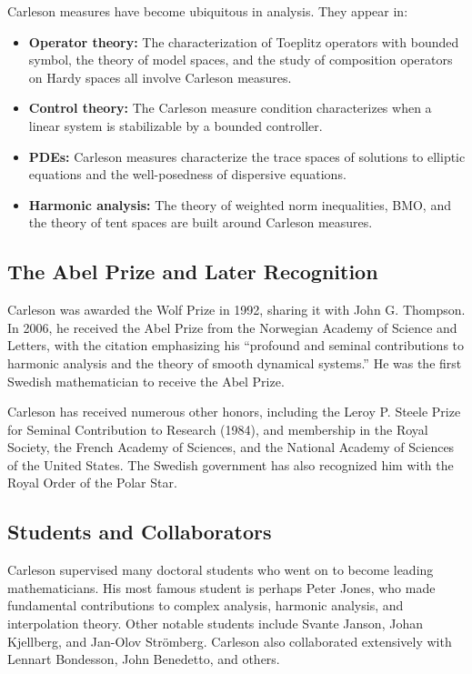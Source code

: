 Carleson measures have become ubiquitous in analysis. They appear in:
\begin{itemize}
    \item \textbf{Operator theory:} The characterization of Toeplitz operators with bounded symbol, the theory of model spaces, and the study of composition operators on Hardy spaces all involve Carleson measures.
    \item \textbf{Control theory:} The Carleson measure condition characterizes when a linear system is stabilizable by a bounded controller.
    \item \textbf{PDEs:} Carleson measures characterize the trace spaces of solutions to elliptic equations and the well-posedness of dispersive equations.
    \item \textbf{Harmonic analysis:} The theory of weighted norm inequalities, BMO, and the theory of tent spaces are built around Carleson measures.
\end{itemize}

\subsection{The Abel Prize and Later Recognition}

Carleson was awarded the Wolf Prize in 1992, sharing it with John G. Thompson. In 2006, he received the Abel Prize from the Norwegian Academy of Science and Letters, with the citation emphasizing his ``profound and seminal contributions to harmonic analysis and the theory of smooth dynamical systems.'' He was the first Swedish mathematician to receive the Abel Prize.

Carleson has received numerous other honors, including the Leroy P. Steele Prize for Seminal Contribution to Research (1984), and membership in the Royal Society, the French Academy of Sciences, and the National Academy of Sciences of the United States. The Swedish government has also recognized him with the Royal Order of the Polar Star.

\subsection{Students and Collaborators}

Carleson supervised many doctoral students who went on to become leading mathematicians. His most famous student is perhaps Peter Jones, who made fundamental contributions to complex analysis, harmonic analysis, and interpolation theory. Other notable students include Svante Janson, Johan Kjellberg, and Jan-Olov Str\"omberg. Carleson also collaborated extensively with Lennart Bondesson, John Benedetto, and others.

